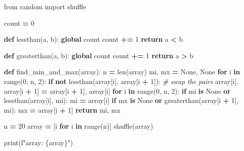 \documentclass[
]{article}
\newenvironment{Shaded}{\begin{snugshade}}{\end{snugshade}}
\newcommand{\BuiltInTok}[1]{#1}
\newcommand{\CommentTok}[1]{\textcolor[rgb]{0.56,0.35,0.01}{\textit{#1}}}
\newcommand{\ControlFlowTok}[1]{\textcolor[rgb]{0.13,0.29,0.53}{\textbf{#1}}}
\newcommand{\DecValTok}[1]{\textcolor[rgb]{0.00,0.00,0.81}{#1}}
\newcommand{\ImportTok}[1]{#1}
\newcommand{\KeywordTok}[1]{\textcolor[rgb]{0.13,0.29,0.53}{\textbf{#1}}}
\newcommand{\NormalTok}[1]{#1}
\newcommand{\OperatorTok}[1]{\textcolor[rgb]{0.81,0.36,0.00}{\textbf{#1}}}
\newcommand{\SpecialCharTok}[1]{\textcolor[rgb]{0.00,0.00,0.00}{#1}}
\newcommand{\SpecialStringTok}[1]{\textcolor[rgb]{0.31,0.60,0.02}{#1}}
\newcommand{\VariableTok}[1]{\textcolor[rgb]{0.00,0.00,0.00}{#1}}
\begin{document}
\begin{Shaded}
\begin{Highlighting}[]
\ImportTok{from}\NormalTok{ random }\ImportTok{import}\NormalTok{ shuffle}
  
\NormalTok{count }\OperatorTok{=} \DecValTok{0}
  
  
\KeywordTok{def}\NormalTok{ lessthan(a, b):}
    \KeywordTok{global}\NormalTok{ count}
\NormalTok{    count }\OperatorTok{+=} \DecValTok{1}
    \ControlFlowTok{return}\NormalTok{ a }\OperatorTok{<}\NormalTok{ b}
  
  
\KeywordTok{def}\NormalTok{ greaterthan(a, b):}
    \KeywordTok{global}\NormalTok{ count}
\NormalTok{    count }\OperatorTok{+=} \DecValTok{1}
    \ControlFlowTok{return}\NormalTok{ a }\OperatorTok{>}\NormalTok{ b}
  
  
\KeywordTok{def}\NormalTok{ find_min_and_max(array):}
\NormalTok{    n }\OperatorTok{=} \BuiltInTok{len}\NormalTok{(array)}
\NormalTok{    mi, mx }\OperatorTok{=} \VariableTok{None}\NormalTok{, }\VariableTok{None}
    \ControlFlowTok{for}\NormalTok{ i }\KeywordTok{in} \BuiltInTok{range}\NormalTok{(}\DecValTok{0}\NormalTok{, n, }\DecValTok{2}\NormalTok{):}
        \ControlFlowTok{if} \KeywordTok{not}\NormalTok{ lessthan(array[i], array[i }\OperatorTok{+} \DecValTok{1}\NormalTok{]):}
            \CommentTok{# swap the pairs}
\NormalTok{            array[i], array[i }\OperatorTok{+} \DecValTok{1}\NormalTok{] }\OperatorTok{=}\NormalTok{ array[i }\OperatorTok{+} \DecValTok{1}\NormalTok{], array[i]}
    \ControlFlowTok{for}\NormalTok{ i }\KeywordTok{in} \BuiltInTok{range}\NormalTok{(}\DecValTok{0}\NormalTok{, n, }\DecValTok{2}\NormalTok{):}
        \ControlFlowTok{if}\NormalTok{ mi }\KeywordTok{is} \VariableTok{None} \KeywordTok{or}\NormalTok{ lessthan(array[i], mi):}
\NormalTok{            mi }\OperatorTok{=}\NormalTok{ array[i]}
        \ControlFlowTok{if}\NormalTok{ mx }\KeywordTok{is} \VariableTok{None} \KeywordTok{or}\NormalTok{ greaterthan(array[i }\OperatorTok{+} \DecValTok{1}\NormalTok{], mi):}
\NormalTok{            mx }\OperatorTok{=}\NormalTok{ array[i }\OperatorTok{+} \DecValTok{1}\NormalTok{]}
    \ControlFlowTok{return}\NormalTok{ mi, mx}
  
  
\NormalTok{n }\OperatorTok{=} \DecValTok{20}
\NormalTok{array }\OperatorTok{=}\NormalTok{ [i }\ControlFlowTok{for}\NormalTok{ i }\KeywordTok{in} \BuiltInTok{range}\NormalTok{(n)]}
\NormalTok{shuffle(array)}
  
\BuiltInTok{print}\NormalTok{(}\SpecialStringTok{f"array: }\SpecialCharTok{\{}\NormalTok{array}\SpecialCharTok{\}}\SpecialStringTok{"}\NormalTok{)}
  

\end{Highlighting}
\end{Shaded}
\end{document}
